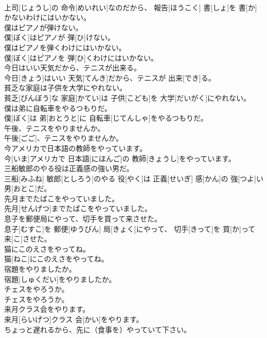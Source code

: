 \documentclass[8pt]{extreport}
\begin{document}
\begin{CJK}{UTF8}{min}
\\	上司[じょうし]の 命令[めいれい]なのだから、 報告[ほうこく] 書[しょ]を 書[か]かないわけにはいかない。
\\	僕はピアノが弾けない。	
\\	僕[ぼく]はピアノが 弾[ひ]けない。
\\	僕はピアノを弾くわけにはいかない。	
\\	僕[ぼく]はピアノを 弾[ひ]くわけにはいかない。
\\	今日はいい天気だから、テニスが出来る。	
\\	今日[きょう]はいい 天気[てんき]だから、テニスが 出来[でき]る。
\\	貧乏な家庭は子供を大学にやれない。	
\\	貧乏[びんぼう]な 家庭[かてい]は 子供[こども]を 大学[だいがく]にやれない。
\\	僕は弟に自転車をやるつもりだ。	
\\	僕[ぼく]は 弟[おとうと]に 自転車[じてんしゃ]をやるつもりだ。
\\	午後、テニスをやりませんか。	
\\	午後[ごご]、テニスをやりませんか。
\\	今アメリカで日本語の教師をやっています。	
\\	今[いま]アメリカで 日本語[にほんご]の 教師[きょうし]をやっています。
\\	三船敏郎のやる役は正義感の強い男だ。	
\\	三船[みふね] 敏郎[としろう]のやる 役[やく]は 正義[せいぎ] 感[かん]の 強[つよ]い 男[おとこ]だ。
\\	先月までたばこをやっていました。	
\\	先月[せんげつ]までたばこをやっていました。
\\	息子を郵便局にやって、切手を買って来させた。	
\\	息子[むすこ]を 郵便[ゆうびん] 局[きょく]にやって、 切手[きって]を 買[か]って 来[こ]させた。
\\	猫にこのえさをやってね。	
\\	猫[ねこ]にこのえさをやってね。
\\	宿題をやりましたか。	
\\	宿題[しゅくだい]をやりましたか。
\\	チェスをやろうか。	
\\	チェスをやろうか。
\\	来月クラス会をやります。	
\\	来月[らいげつ]クラス 会[かい]をやります。
\\	ちょっと遅れるから、先に（食事を）やっていて下さい。	

\end{CJK}
\end{document}
